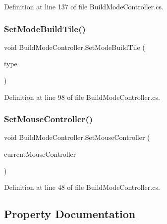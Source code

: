 Definition at line 137 of file Build\+Mode\+Controller.\+cs.

\mbox{\label{class_build_mode_controller_a15f5663c50eb333203de7c643eae6079}} 
\subsubsection{\texorpdfstring{Set\+Mode\+Build\+Tile()}{SetModeBuildTile()}}
{\footnotesize\ttfamily void Build\+Mode\+Controller.\+Set\+Mode\+Build\+Tile (\begin{DoxyParamCaption}\item[{\hyperlink{class_tile_type}{Tile\+Type}}]{type }\end{DoxyParamCaption})}



Definition at line 98 of file Build\+Mode\+Controller.\+cs.

\mbox{\label{class_build_mode_controller_aeff1dc27c03ea6b305e96cd27479e4f0}} 
\subsubsection{\texorpdfstring{Set\+Mouse\+Controller()}{SetMouseController()}}
{\footnotesize\ttfamily void Build\+Mode\+Controller.\+Set\+Mouse\+Controller (\begin{DoxyParamCaption}\item[{\hyperlink{class_mouse_controller}{Mouse\+Controller}}]{current\+Mouse\+Controller }\end{DoxyParamCaption})}



Definition at line 48 of file Build\+Mode\+Controller.\+cs.



\subsection{Property Documentation}
\mbox{\label{class_build_mode_controller_ac6fdada4acb0019086133d0a14f588d5}} 
